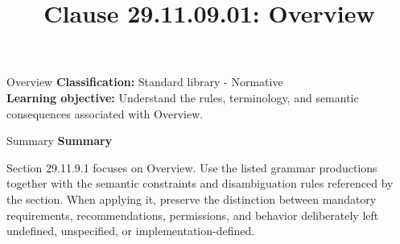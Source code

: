 \documentclass[10pt,letterpaper]{article}
\title{Clause 29.11.09.01: Overview}
\author{}
\date{}
\begin{document}
\maketitle
\begin{CornellOverviewBox}{Overview}
\textbf{Classification:} Standard library - Normative\\[2pt]
\textbf{Learning objective:} Understand the rules, terminology, and semantic consequences associated with Overview.
\end{CornellOverviewBox}\begin{CornellSummaryBox}{Summary}
{\sffamily\bfseries\color{Accent} Summary}\par\vspace{3pt}Section 29.11.9.1 focuses on Overview. Use the listed grammar productions together with the semantic constraints and disambiguation rules referenced by the section. When applying it, preserve the distinction between mandatory requirements, recommendations, permissions, and behavior deliberately left undefined, unspecified, or implementation-defined.
\end{CornellSummaryBox}
\end{document}
